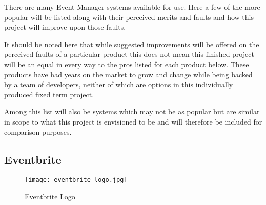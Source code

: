 

There are many Event Manager systems available for use. Here a few of the more popular will be listed along with their perceived merits and faults and how this project will improve upon those faults. 

It should be noted here that while suggested improvements will be offered on the perceived faults of a particular product this does not mean this finished project will be an equal in every way to the pros listed for each product below. These products have had years on the market to grow and change while being backed by a team of developers, neither of which are options in this individually produced fixed term project.

Among this list will also be systems which may not be as popular but are similar in scope to what this project is envisioned to be and will therefore be included for comparison purposes.

\subsection{Eventbrite}
\label{eventbritesubsection}

\begin{figure}[ht]
  \centering
      \texttt{[image: eventbrite\_logo.jpg]}
  \caption[Eventbrite Logo]{Eventbrite Logo\cite{eventbritelogo}}
  \label{fig:eventbritelogo}
\end{figure}

